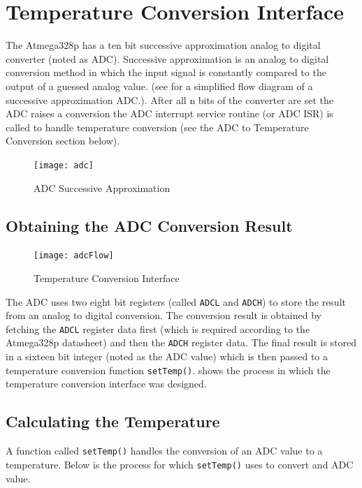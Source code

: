 \documentclass[main.tex]{subfiles}
\begin{document}
	\section{Temperature Conversion Interface}
	The Atmega328p has a ten bit successive approximation analog to digital
	converter (noted as ADC). Successive approximation is an analog to digital
	conversion method in which the input signal is constantly compared to the
	output of a guessed analog value. (see  for a simplified flow
	diagram of a successive approximation ADC.). After all n bits of the converter
	are set the ADC raises a conversion the ADC interrupt service routine (or ADC
	ISR) is called to handle temperature conversion (see the ADC to Temperature
	Conversion section below). 
	\begin{figure}[H]
		\begin{center}
			\texttt{[image: adc]}
		\end{center}
		\caption{ADC Successive Approximation}
		\label{fig:adcSA}
	\end{figure}
	
		\subsection{Obtaining the ADC Conversion Result}
		\begin{figure}[H]
			\begin{center}
				\texttt{[image: adcFlow]}
			\end{center}
			\caption{Temperature Conversion Interface}
			\label{fig:tempConvIfc}
		\end{figure}

		The ADC uses two eight bit registers (called \lstinline{ADCL} and
		\lstinline{ADCH}) to store the result from an analog to digital conversion.
		The conversion result is obtained by fetching the \lstinline{ADCL} register
		data first (which is required according to the Atmega328p datasheet) and
		then the \lstinline{ADCH} register data. The final result is stored in a
		sixteen bit integer (noted as the ADC value) which is then passed to a
		temperature conversion function \lstinline{setTemp()}. 
		shows the process in which the temperature conversion interface was
		designed.

		\subsection{Calculating the Temperature}
		A function called \lstinline{setTemp()} handles the conversion of an ADC
		value to a temperature. Below is the process for which
		\lstinline{setTemp()} uses to convert and ADC value. 
	
\end{document}
